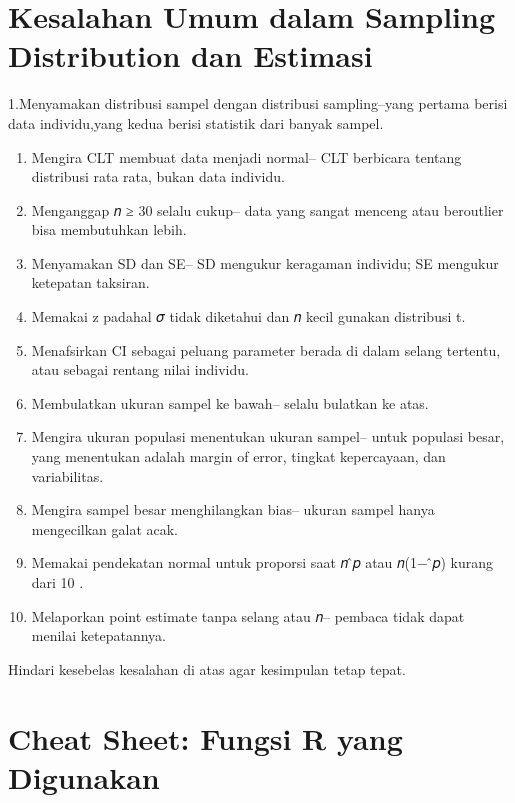 \documentclass[
  indonesian,
  letterpaper,
]{book}
\begin{document}
\section{Kesalahan Umum dalam Sampling Distribution dan
Estimasi}\label{kesalahan-umum-dalam-sampling-distribution-dan-estimasi}

1.Menyamakan distribusi sampel dengan distribusi sampling--yang pertama
berisi data individu,yang kedua berisi statistik dari banyak sampel.

\begin{enumerate}
\def\labelenumi{\arabic{enumi}.}
\setcounter{enumi}{1}
\item
  Mengira CLT membuat data menjadi normal-- CLT berbicara tentang
  distribusi rata rata, bukan data individu.
\item
  Menganggap 𝑛 ≥ 30 selalu cukup-- data yang sangat menceng atau
  beroutlier bisa membutuhkan lebih.
\item
  Menyamakan SD dan SE-- SD mengukur keragaman individu; SE mengukur
  ketepatan taksiran.
\item
  Memakai z padahal 𝜎 tidak diketahui dan 𝑛 kecil gunakan distribusi t.
\item
  Menafsirkan CI sebagai peluang parameter berada di dalam selang
  tertentu, atau sebagai rentang nilai individu.
\item
  Membulatkan ukuran sampel ke bawah-- selalu bulatkan ke atas.
\item
  Mengira ukuran populasi menentukan ukuran sampel-- untuk populasi
  besar, yang menentukan adalah margin of error, tingkat kepercayaan,
  dan variabilitas.
\item
  Mengira sampel besar menghilangkan bias-- ukuran sampel hanya
  mengecilkan galat acak.
\item
  Memakai pendekatan normal untuk proporsi saat 𝑛 ̂𝑝 atau 𝑛(1− ̂𝑝)
  kurang dari 10 .
\item
  Melaporkan point estimate tanpa selang atau 𝑛-- pembaca tidak dapat
  menilai ketepatannya.
\end{enumerate}

Hindari kesebelas kesalahan di atas agar kesimpulan tetap tepat.

\section{Cheat Sheet: Fungsi R yang
Digunakan}\label{cheat-sheet-fungsi-r-yang-digunakan}
\end{document}
